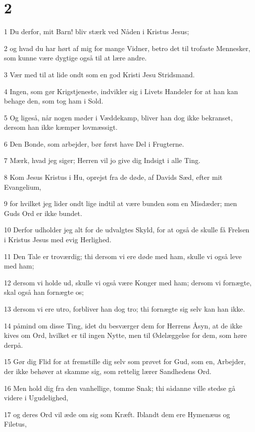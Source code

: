 \chapter{2}

\par 1 Du derfor, mit Barn! bliv stærk ved Nåden i Kristus Jesus;
\par 2 og hvad du har hørt af mig for mange Vidner, betro det til trofaste Mennesker, som kunne være dygtige også til at lære andre.
\par 3 Vær med til at lide ondt som en god Kristi Jesu Stridsmand.
\par 4 Ingen, som gør Krigstjeneste, indvikler sig i Livets Handeler for at han kan behage den, som tog ham i Sold.
\par 5 Og ligeså, når nogen møder i Væddekamp, bliver han dog ikke bekranset, dersom han ikke kæmper lovmæssigt.
\par 6 Den Bonde, som arbejder, bør først have Del i Frugterne.
\par 7 Mærk, hvad jeg siger; Herren vil jo give dig Indsigt i alle Ting.
\par 8 Kom Jesus Kristus i Hu, oprejst fra de døde, af Davids Sæd, efter mit Evangelium,
\par 9 for hvilket jeg lider ondt lige indtil at være bunden som en Misdæder; men Guds Ord er ikke bundet.
\par 10 Derfor udholder jeg alt for de udvalgtes Skyld, for at også de skulle få Frelsen i Kristus Jesus med evig Herlighed.
\par 11 Den Tale er troværdig; thi dersom vi ere døde med ham, skulle vi også leve med ham;
\par 12 dersom vi holde ud, skulle vi også være Konger med ham; dersom vi fornægte, skal også han fornægte os;
\par 13 dersom vi ere utro, forbliver han dog tro; thi fornægte sig selv kan han ikke.
\par 14 påmind om disse Ting, idet du besværger dem for Herrens Åsyn, at de ikke kives om Ord, hvilket er til ingen Nytte, men til Ødelæggelse for dem, som høre derpå.
\par 15 Gør dig Flid for at fremstille dig selv som prøvet for Gud, som en, Arbejder, der ikke behøver at skamme sig, som rettelig lærer Sandhedens Ord.
\par 16 Men hold dig fra den vanhellige, tomme Snak; thi sådanne ville stedse gå videre i Ugudelighed,
\par 17 og deres Ord vil æde om sig som Kræft. Iblandt dem ere Hymenæus og Filetus,
